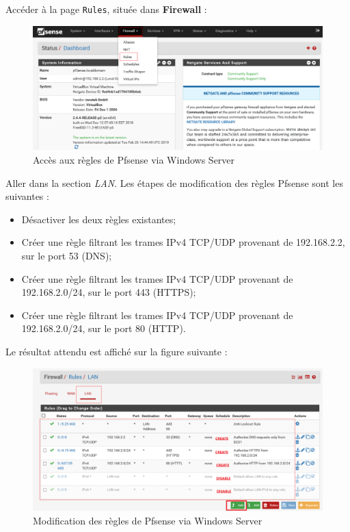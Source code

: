 Accéder à la page \texttt{Rules}, située dans \textbf{Firewall} :
\begin{figure}[h!]
	\begin{center}
		\includegraphics[scale=0.5]{Pfsense_Screeshots/21.png}
		\caption{Accès aux règles de Pfsense via Windows Server}
		\label{Pfsense_Screeshots/21}
	\end{center}
\end{figure}
\FloatBarrier

Aller dans la section \textit{LAN}. Les étapes de modification des règles Pfsense sont les suivantes :
\begin{itemize}
    \item Désactiver les deux règles existantes;
    \item Créer une règle filtrant les trames IPv4 TCP/UDP provenant de 192.168.2.2, sur le port 53 (DNS);
    \item Créer une règle filtrant les trames IPv4 TCP/UDP provenant de 192.168.2.0/24, sur le port 443 (HTTPS);
    \item Créer une règle filtrant les trames IPv4 TCP/UDP provenant de 192.168.2.0/24, sur le port 80 (HTTP).
\end{itemize}
Le résultat attendu est affiché sur la figure suivante :
\begin{figure}[h!]
	\begin{center}
		\includegraphics[scale=0.2]{Pfsense_Screeshots/22.png}
		\caption{Modification des règles de Pfsense via Windows Server}
		\label{Pfsense_Screeshots/22}
	\end{center}
\end{figure}
\FloatBarrier